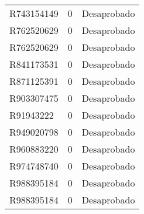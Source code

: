\documentclass[a4paper,12pt]{article}
\begin{document}
\begin{tabular}{l l l}
R743154149 & 0 & Desaprobado \\
R762520629 & 0 & Desaprobado \\
R762520629 & 0 & Desaprobado \\
R841173531 & 0 & Desaprobado \\
R871125391 & 0 & Desaprobado \\
R903307475 & 0 & Desaprobado \\
R91943222 & 0 & Desaprobado \\
R949020798 & 0 & Desaprobado \\
R960883220 & 0 & Desaprobado \\
R974748740 & 0 & Desaprobado \\
R988395184 & 0 & Desaprobado \\
R988395184 & 0 & Desaprobado \\
\end{tabular}
\end{document}
